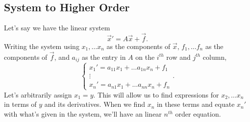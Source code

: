 \subsection{System to Higher Order}
Let's say we have the linear system
\begin{equation*}
	\vec{x}' = A\vec{x} + \vec{f}.
\end{equation*}
Writing the system using $x_1, \ldots x_n$ as the components of $\vec{x}$, $f_1, \ldots f_n$ as the components of $\vec{f}$, and $a_{ij}$ as the entry in $A$ on the $i^{th}$ row and $j^{th}$ column,
\begin{equation*}
	\begin{cases}
		x_1' = a_{11}x_1 + \ldots a_{1n}x_n + f_1 \\
		\vdots \\
		x_n' = a_{n1}x_1 + \ldots a_{nn}x_n + f_n
	\end{cases}.
\end{equation*}
Let's arbitrarily assign $x_1 = y$.
This will allow us to find expressions for $x_2, \ldots x_n$ in terms of $y$ and its derivatives. When we find $x_n$ in these terms and equate $x_n'$ with what's given in the system, we'll have an linear $n^{th}$ order equation.

